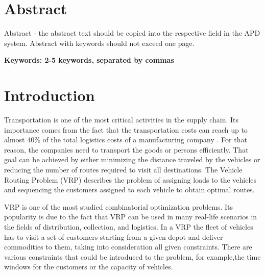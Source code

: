 \documentclass[a4paper,twoside,12pt]{book}
\newcounter{PagesWithoutNumbers}
\begin{document}
\pagestyle{onlyPageNumbers}
\tableofcontents

\setcounter{PagesWithoutNumbers}{\value{page}}
\mainmatter
\pagestyle{empty}

\chapter*{Abstract}

Abstract - the abstract text should be copied into the respective field in the APD system. Abstract with keywords should not exceed one page.

\bf{Keywords:} 2-5 keywords, separated by commas


\cleardoublepage


\pagestyle{PageNumbersChapterTitles}


\normalfont
\chapter{Introduction}

 Transportation is one of the most critical activities in the supply chain. Its importance comes from the fact that the transportation costs can reach up to almost 40\% of the total logistics costs of a manufacturing company \cite{bib:article:sukiennik}. For that reason, the companies need to transport the goods or persons efficiently. That goal can be achieved by either minimizing the distance traveled by the vehicles or reducing the number of routes required to visit all destinations. The Vehicle Routing Problem (VRP) describes the problem of assigning loads to the vehicles and sequencing the customers assigned to each vehicle to obtain optimal routes.

VRP is one of the most studied combinatorial optimization problems. Its popularity is due to the fact that VRP can be used in many real-life scenarios in the fields of distribution, collection, and logistics.
In a VRP the fleet of vehicles has to visit a set of customers starting from a given depot and deliver commodities to them, taking into consideration all given constraints. There are various constraints that could be introduced to the problem, for example,the time windows for the customers or the capacity of vehicles.
\end{document}
